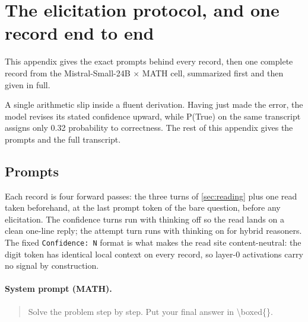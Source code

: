 \section{The elicitation protocol, and one record end to end}
\label{app:worked}

This appendix gives the exact prompts behind every record, then one complete record
from the Mistral-Small-24B $\times$ MATH cell, summarized first and then given in full.

\begin{center}
\footnotesize
{}
\end{center}

\noindent
A single arithmetic slip inside a fluent derivation. Having just made the error, the model
revises its stated confidence upward, while P(True) on the same transcript assigns only
0.32 probability to correctness. The rest of this appendix gives the prompts and the full transcript.

\subsection{Prompts}

Each record is four forward passes: the three turns of \cref{sec:reading} plus one read taken
beforehand, at the last prompt token of the bare question, before any elicitation. The confidence turns
run with thinking off so the read lands on a clean one-line reply; the attempt turn runs
with thinking on for hybrid reasoners. The fixed \texttt{Confidence: N} format is what makes
the read site content-neutral: the digit token has identical local context on every record,
so layer-0 activations carry no signal by construction.

\paragraph{System prompt (MATH).}
\begin{quote}\ttfamily\footnotesize
Solve the problem step by step. Put your final answer in \textbackslash boxed\{\}.
\end{quote}

